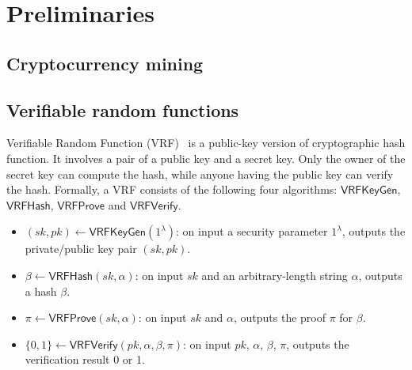 \section{Preliminaries}

\subsection{Cryptocurrency mining}




\subsection{Verifiable random functions}


Verifiable Random Function (VRF)~\cite{} is a public-key version of cryptographic hash function.
It involves a pair of a public key and a secret key.
Only the owner of the secret key can compute the hash, while anyone having the public key can verify the hash.
Formally, a VRF consists of the following four algorithms: $\mathsf{VRFKeyGen}$, $\mathsf{VRFHash}$, $\mathsf{VRFProve}$ and $\mathsf{VRFVerify}$.

\begin{itemize}
    \item $(sk, pk) \gets \mathsf{VRFKeyGen}(1^{\lambda})$: on input a security parameter $1^{\lambda}$, outputs the private/public key pair $(sk, pk)$.
    \item $\beta \gets \mathsf{VRFHash}(sk, \alpha)$: on input $sk$ and an arbitrary-length string $\alpha$, outputs a hash $\beta$.
    \item $\pi \gets \mathsf{VRFProve}(sk, \alpha)$: on input $sk$ and $\alpha$, outputs the proof $\pi$ for $\beta$.
    \item $\{0, 1\} \gets \mathsf{VRFVerify}(pk, \alpha, \beta, \pi)$: on input $pk$, $\alpha$, $\beta$, $\pi$, outputs the verification result 0 or 1.
\end{itemize}